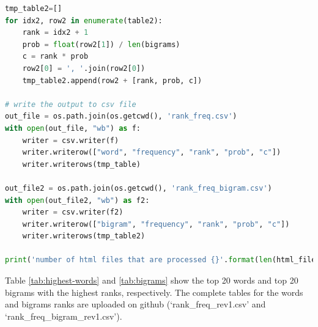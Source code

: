 \documentclass[letterpaper,11pt]{article}
\begin{document}
\begin{lstlisting}[language=python, caption={Tokenizing the content of Wikipedia collection}, label={lst:token-wiki}]
tmp_table2=[]
for idx2, row2 in enumerate(table2):
    rank = idx2 + 1
    prob = float(row2[1]) / len(bigrams)
    c = rank * prob
    row2[0] = ', '.join(row2[0])
    tmp_table2.append(row2 + [rank, prob, c])

# write the output to csv file
out_file = os.path.join(os.getcwd(), 'rank_freq.csv')
with open(out_file, "wb") as f:
    writer = csv.writer(f)
    writer.writerow(["word", "frequency", "rank", "prob", "c"])
    writer.writerows(tmp_table)

out_file2 = os.path.join(os.getcwd(), 'rank_freq_bigram.csv')
with open(out_file2, "wb") as f2:
    writer = csv.writer(f2)
    writer.writerow(["bigram", "frequency", "rank", "prob", "c"])
    writer.writerows(tmp_table2)

print('number of html files that are processed {}'.format(len(html_files)))

\end{lstlisting}

Table \ref{tab:highest-words} and \ref{tab:bigrams} show the top 20 words and top 20 bigrams with the highest ranks, respectively. The complete tables for the words and bigrams ranks are uploaded on github (`rank\_freq\_rev1.csv' and `rank\_freq\_bigram\_rev1.csv'). \linebreak
\end{document}

